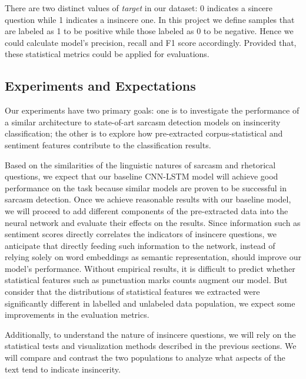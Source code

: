 \documentclass[12pt]{diazessay} %
\begin{document}
There are two distinct values of \textit{target} in our dataset: 0 indicates a sincere question while 1 indicates a insincere one. In this project we define samples that are labeled as 1 to be positive while those labeled as 0 to be negative. Hence we could calculate model's precision, recall and F1 score accordingly. Provided that, these statistical metrics could be applied for evaluations.


\subsection{Experiments and Expectations}

Our experiments have two primary goals: one is to investigate the performance of a similar architecture to state-of-art sarcasm detection models on insincerity classification; the other is to explore how pre-extracted corpus-statistical and sentiment features contribute to the classification results. 

Based on the similarities of the linguistic natures of sarcasm and rhetorical questions, we expect that our baseline CNN-LSTM model will achieve good performance on the task because similar models are proven to be successful in sarcasm detection. Once we achieve reasonable results with our baseline model, we will proceed to add different components of the pre-extracted data into the neural network and evaluate their effects on the results. Since information such as sentiment scores directly correlates the indicators of insincere questions, we anticipate that directly feeding such information to the network, instead of relying solely on word embeddings as semantic representation, should improve our model's performance. Without empirical results, it is difficult to predict whether statistical features such as punctuation marks counts augment our model. But consider that the distributions of statistical features we extracted were significantly different in labelled and unlabeled data population, we expect some improvements in the evaluation metrics.

Additionally, to understand the nature of insincere questions, we will rely on the statistical tests and visualization methods described in the previous sections. We will compare and contrast the two populations to analyze what aspects of the text tend to indicate insincerity. 







\newpage




\end{document}
